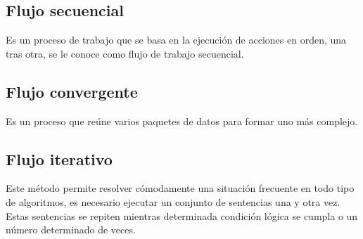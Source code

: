 \documentclass{article}
\begin{document}
\subsection{Flujo secuencial}

Es un proceso de trabajo que se basa en la ejecución de acciones en orden, una tras otra, se le conoce como flujo de trabajo secuencial.

\subsection{Flujo convergente}

Es un proceso que reúne varios paquetes de datos para formar uno más complejo.

\subsection{Flujo iterativo}

Este método permite resolver cómodamente una situación frecuente en todo tipo de algoritmos, es necesario ejecutar un conjunto de sentencias una y otra vez. Estas sentencias se repiten mientras determinada condición lógica se cumpla o un número determinado de veces.
\end{document}
